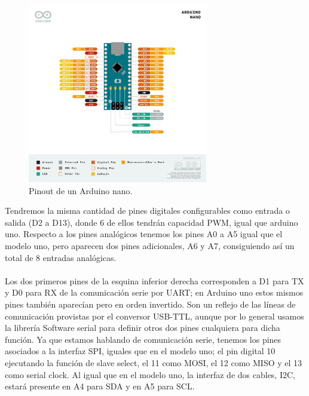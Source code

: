 \documentclass[12pt]{article}
\begin{document}
	\begin{figure}[h]
		\begin{center}
			\includegraphics[width=0.7\textwidth]{img/Pinout-NANO_official.png}
			\caption{Pinout de un Arduino nano.}
			\label{Pinout Arduino nano}
		\end{center}
	\end{figure}

	\pagebreak
	
	\noindent Tendremos la misma cantidad de pines digitales configurables como entrada o salida (D2 a D13), donde 6 de ellos tendrán capacidad PWM, igual que arduino uno. Respecto a los pines analógicos tenemos los pines A0 a A5 igual que el modelo uno, pero aparecen dos pines adicionales, A6 y A7, consiguiendo así un total de 8 entradas analógicas. \\
	
	 \\
	
	\noindent Los dos primeros pines de la esquina inferior derecha corresponden a D1 para TX y D0 para RX de la comunicación serie por UART; en Arduino uno estos mismos pines también aparecían pero en orden invertido. Son un reflejo de las líneas de comunicación provistas por el conversor USB-TTL, aunque por lo general usamos la librería Software serial para definir otros dos pines cualquiera para dicha función. Ya que estamos hablando de comunicación serie, tenemos los pines asociados a la interfaz SPI, iguales que en el modelo uno; el pin digital 10 ejecutando la función de slave select, el 11 como MOSI, el 12 como MISO y el 13 como serial clock. Al igual que en el modelo uno, la interfaz de dos cables, I2C, estará presente en A4 para SDA y en A5 para SCL. \\
	
\end{document}
